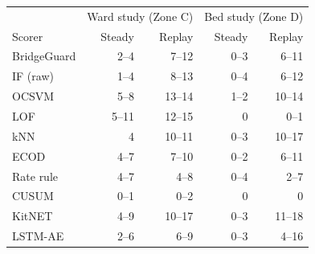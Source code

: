 \begin{tabular}{l rr rr}
\toprule
 & \multicolumn{2}{c}{Ward study (Zone C)} & \multicolumn{2}{c}{Bed study (Zone D)} \\
Scorer & Steady & Replay & Steady & Replay \\
\midrule
BridgeGuard & 2--4 & 7--12 & 0--3 & 6--11 \\
IF (raw) & 1--4 & 8--13 & 0--4 & 6--12 \\
OCSVM & 5--8 & 13--14 & 1--2 & 10--14 \\
LOF & 5--11 & 12--15 & 0 & 0--1 \\
kNN & 4 & 10--11 & 0--3 & 10--17 \\
ECOD & 4--7 & 7--10 & 0--2 & 6--11 \\
Rate rule & 4--7 & 4--8 & 0--4 & 2--7 \\
CUSUM & 0--1 & 0--2 & 0 & 0 \\
KitNET & 4--9 & 10--17 & 0--3 & 11--18 \\
LSTM-AE & 2--6 & 6--9 & 0--3 & 4--16 \\
\bottomrule
\end{tabular}
